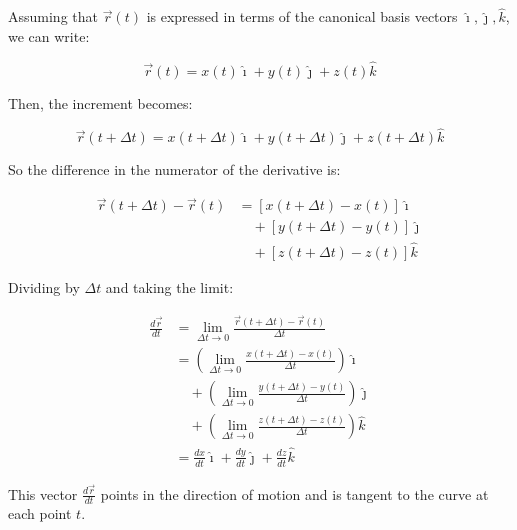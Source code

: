 Assuming that \(\vec{r}(t)\) is expressed in terms of the canonical basis vectors \(\hat{\imath}, \hat{\jmath}, \hat{k}\), 
we can write:

\[
\vec{r}(t) = x(t)\hat{\imath} + y(t)\hat{\jmath} + z(t)\hat{k}
\]

Then, the increment becomes:

\[
\vec{r}(t + \Delta t) = x(t + \Delta t)\hat{\imath} + y(t + \Delta t)\hat{\jmath} + z(t + \Delta t)\hat{k}
\]

So the difference in the numerator of the derivative is:

\begin{align*}
\vec{r}(t + \Delta t) - \vec{r}(t) &= \left[x(t + \Delta t) - x(t)\right]\hat{\imath} \\
&\quad + \left[y(t + \Delta t) - y(t)\right]\hat{\jmath} \\
&\quad + \left[z(t + \Delta t) - z(t)\right]\hat{k}
\end{align*}

Dividing by \(\Delta t\) and taking the limit:

\begin{align*}
\frac{d\vec{r}}{dt} &= \lim_{\Delta t \to 0} \frac{\vec{r}(t + \Delta t) - \vec{r}(t)}{\Delta t} \\
&= \left( \lim_{\Delta t \to 0} \frac{x(t + \Delta t) - x(t)}{\Delta t} \right) \hat{\imath} \\
&\quad + \left( \lim_{\Delta t \to 0} \frac{y(t + \Delta t) - y(t)}{\Delta t} \right) \hat{\jmath} \\
&\quad + \left( \lim_{\Delta t \to 0} \frac{z(t + \Delta t) - z(t)}{\Delta t} \right) \hat{k} \\
&= \frac{dx}{dt} \hat{\imath} + \frac{dy}{dt} \hat{\jmath} + \frac{dz}{dt} \hat{k}
\end{align*}

This vector \(\frac{d\vec{r}}{dt}\) points in the direction of motion and is tangent to the curve at each point \(t\).


\newpage